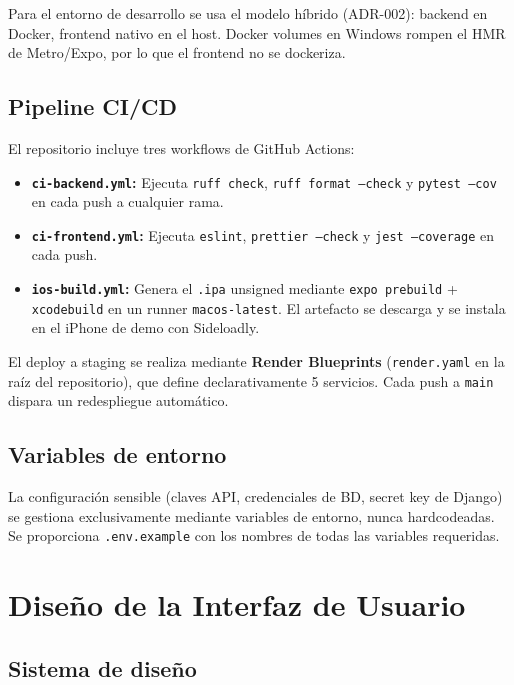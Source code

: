 Para el entorno de desarrollo se usa el modelo h\'ibrido (ADR-002): backend en Docker, frontend
nativo en el host. Docker volumes en Windows rompen el HMR de Metro/Expo, por lo que el frontend
no se dockeriza.

\subsection{Pipeline CI/CD}\label{subsec:cicd}

El repositorio incluye tres workflows de GitHub Actions:

\begin{itemize}
  \item \textbf{\texttt{ci-backend.yml}:} Ejecuta \texttt{ruff check}, \texttt{ruff format
    --check} y \texttt{pytest --cov} en cada push a cualquier rama.
  \item \textbf{\texttt{ci-frontend.yml}:} Ejecuta \texttt{eslint}, \texttt{prettier --check}
    y \texttt{jest --coverage} en cada push.
  \item \textbf{\texttt{ios-build.yml}:} Genera el \texttt{.ipa} unsigned mediante
    \texttt{expo prebuild} + \texttt{xcodebuild} en un runner \texttt{macos-latest}. El artefacto
    se descarga y se instala en el iPhone de demo con Sideloadly.
\end{itemize}

El deploy a staging se realiza mediante \textbf{Render Blueprints} (\texttt{render.yaml} en la
ra\'iz del repositorio), que define declarativamente 5 servicios. Cada push a \texttt{main}
dispara un redespliegue autom\'atico.

\subsection{Variables de entorno}\label{subsec:env}

La configuraci\'on sensible (claves API, credenciales de BD, secret key de Django) se gestiona
exclusivamente mediante variables de entorno, nunca hardcodeadas. Se proporciona
\texttt{.env.example} con los nombres de todas las variables requeridas.

\section{Dise\~no de la Interfaz de Usuario}\label{sec:ui}

\subsection{Sistema de dise\~no}\label{subsec:design-system}

